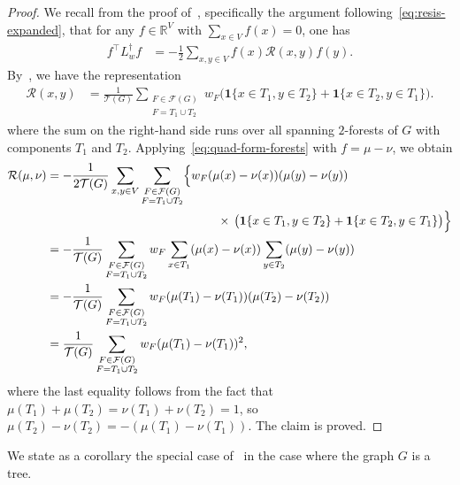 \documentclass[11pt,a4paper]{article}
\newcommand{\Resis}{\mathcal{R}}
\newcommand{\Tree}{\mathcal{T}}
\newcommand{\Forest}{\mathcal{F}}
\begin{document}
\begin{proof}
    We recall from the proof of~, specifically the argument following~\cref{eq:resis-expanded}, that for any $f\in\mathbb{R}^{V}$ with $\sum_{x\in V}f(x) = 0$, one has
        \begin{align}\label{eq:quad-form-forests}
            f^\top L_w^\dagger f &= -\frac{1}{2}\sum_{x, y\in V} f(x) \Resis(x, y) f(y).
        \end{align}
    By~, we have the representation
        \begin{align*}
            \Resis(x, y) &= \frac{1}{\Tree(G)} \sum_{\substack{F\in\Forest (G) \\ F=T_1\cup T_2}} w_{F} \Big(\mathbf{1}\{x\in T_1, y\in T_2\}+\mathbf{1}\{x\in T_2, y\in T_1\}\Big).
        \end{align*}
    where the sum on the right-hand side runs over all spanning $2$-forests of $G$ with components $T_1$ and $T_2$. Applying~\cref{eq:quad-form-forests} with $f = \mu-\nu$, we obtain
        \begin{align*}
            \Resis(\mu,\nu) &= -\frac{1}{2\Tree(G)}\sum_{x, y\in V} \sum_{\substack{F\in\Forest (G) \\ F=T_1\cup T_2}} \Bigl\{  w_F (\mu(x)- \nu(x)) (\mu(y)- \nu(y)) \, \\
            &\qquad\qquad\qquad\qquad\qquad\qquad\qquad\,\times\,\bigl(\mathbf{1}\{x\in T_1, y\in T_2\}+\mathbf{1}\{x\in T_2, y\in T_1\}\bigr) \Bigr\}\\
            &= -\frac{1}{\Tree(G)} \sum_{\substack{F\in\Forest (G) \\ F=T_1\cup T_2}} w_F \sum_{x\in T_1} (\mu(x)- \nu(x))  \sum_{y\in T_2} (\mu(y)- \nu(y)) \\
            &= -\frac{1}{\Tree(G)} \sum_{\substack{F\in\Forest (G) \\ F=T_1\cup T_2}} w_F (\mu(T_1) - \nu(T_1))  (\mu(T_2) - \nu(T_2)) \\
            &= \frac{1}{\Tree(G)} \sum_{\substack{F\in\Forest (G) \\ F=T_1\cup T_2}} w_F (\mu(T_1) - \nu(T_1))^2,
        \end{align*} 
    where the last equality follows from the fact that $\mu(T_1) + \mu(T_2) = \nu(T_1) + \nu(T_2) = 1$, so $\mu(T_2) - \nu(T_2) = -(\mu(T_1) - \nu(T_1))$. The claim is proved.
\end{proof}

We state as a corollary the special case of~ in the case where the graph $G$ is a tree.
\end{document}
